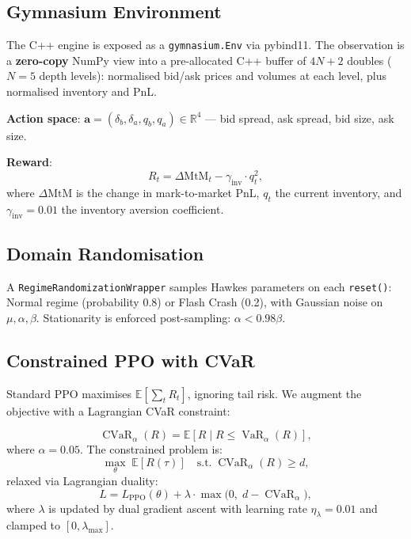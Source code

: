 \documentclass[11pt,twocolumn]{article}
\newcommand{\CVaR}{\operatorname{CVaR}}
\newcommand{\VaR}{\operatorname{VaR}}
\newcommand{\E}{\mathbb{E}}
\newcommand{\R}{\mathbb{R}}
\begin{document}
\subsection{Gymnasium Environment}\label{sec:env}

The C++ engine is exposed as a \texttt{gymnasium.Env} via pybind11.
The observation is a \textbf{zero-copy} NumPy view into a pre-allocated
C++ buffer of $4N{+}2$ doubles ($N{=}5$ depth levels):
normalised bid/ask prices and volumes at each level, plus normalised
inventory and PnL.

\textbf{Action space}: $\mathbf{a} = (\delta_b, \delta_a, q_b, q_a)
\in \R^4$ — bid spread, ask spread, bid size, ask size.

\textbf{Reward}:
\begin{equation}\label{eq:reward}
  R_t = \Delta\text{MtM}_t - \gamma_{\text{inv}} \cdot q_t^2,
\end{equation}
where $\Delta\text{MtM}$ is the change in mark-to-market PnL,
$q_t$ the current inventory, and $\gamma_{\text{inv}} = 0.01$ the
inventory aversion coefficient.

\subsection{Domain Randomisation}\label{sec:domain-rand}

A \texttt{RegimeRandomizationWrapper} samples Hawkes parameters on each
\texttt{reset()}: Normal regime (probability 0.8) or Flash Crash (0.2),
with Gaussian noise on $\mu, \alpha, \beta$.  Stationarity is enforced
post-sampling: $\alpha < 0.98\beta$.

\subsection{Constrained PPO with CVaR}\label{sec:cppo}

Standard PPO maximises $\E[\sum_t R_t]$, ignoring tail risk.
We augment the objective with a Lagrangian CVaR constraint:

\begin{equation}\label{eq:cvar}
  \CVaR_\alpha(R) = \E[R \mid R \le \VaR_\alpha(R)],
\end{equation}
where $\alpha = 0.05$.  The constrained problem is:
\begin{equation}\label{eq:cppo-obj}
  \max_\theta\; \E[R(\tau)] \quad
  \text{s.t.}\; \CVaR_\alpha(R) \ge d,
\end{equation}
relaxed via Lagrangian duality:
\begin{equation}\label{eq:lagrangian}
  L = L_{\text{PPO}}(\theta)
    + \lambda \cdot \max\!\bigl(0,\; d - \CVaR_\alpha\bigr),
\end{equation}
where $\lambda$ is updated by dual gradient ascent with learning rate
$\eta_\lambda = 0.01$ and clamped to $[0, \lambda_{\max}]$.
\end{document}
